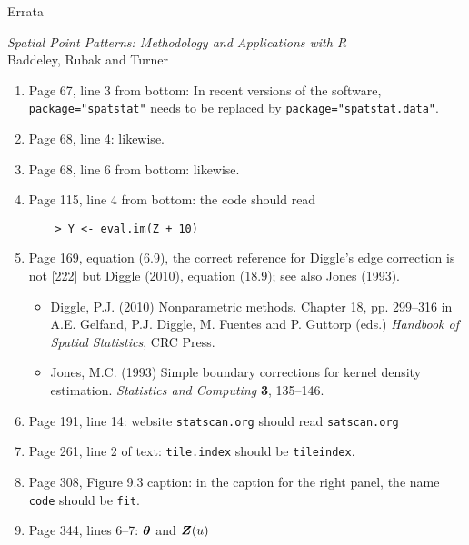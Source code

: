 \documentclass[12pt,a4paper]{article}
\newcommand{\boldmaths}[1]{{\ensuremath\boldsymbol{#1}}}
\newcommand{\bZ}{\boldmaths Z}
\begin{document}
\thispagestyle{empty}
\begin{center}
  \begin{LARGE}
    Errata 
  \end{LARGE}

  \begin{large}
    \emph{Spatial Point Patterns: Methodology and Applications with R}\\
    Baddeley, Rubak and Turner
  \end{large}
\end{center}

\begin{enumerate}
\item Page 67, line 3 from bottom: In recent versions of the software,
  \texttt{package="spatstat"} needs to be replaced by
  \texttt{package="spatstat.data"}.
\item Page 68, line 4: likewise.
\item Page 68, line 6 from bottom: likewise.
\item Page 115, line 4 from bottom: the code should read
\begin{verbatim}
    > Y <- eval.im(Z + 10)
\end{verbatim}
\item Page 169, equation (6.9), the correct reference for Diggle's
edge correction is not [222] %
but Diggle (2010), equation (18.9); see also Jones (1993).
\begin{small}
  \begin{itemize}
  \item
    Diggle, P.J. (2010)
    Nonparametric methods.
    Chapter 18, pp. 299--316 in
    A.E. Gelfand, P.J. Diggle, M. Fuentes and P. Guttorp (eds.)
    \emph{Handbook of Spatial Statistics}, CRC Press.
  \item  Jones, M.C. (1993)
    Simple boundary corrections for kernel density estimation.
    \emph{Statistics and Computing} \textbf{3}, 135--146.
  \end{itemize}
\end{small}
\item Page 191, line 14: 
 website \texttt{statscan.org} should read \texttt{satscan.org}
\item Page 261, line 2 of text: 
\texttt{tile.index} should be \texttt{tileindex}.
\item Page 308, Figure 9.3 caption: in the caption for the right panel,
the name \texttt{code} should be \texttt{fit}.
\item Page 344, lines 6--7: $\boldmaths\theta$ and $\bZ(u)$ 

\end{enumerate}
\end{document}
